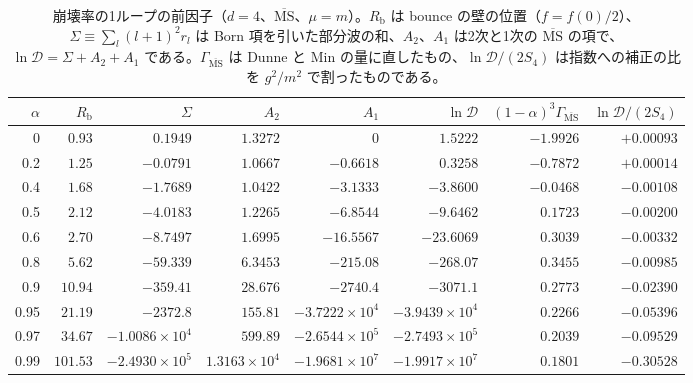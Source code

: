 \documentclass[a4paper,10pt]{ltjsarticle}
\begin{document}
\begin{table}[tbp]
\centering\small
\caption{崩壊率の1ループの前因子（$d=4$、$\overline{\mathrm{MS}}$、$\mu=m$）。$R_{\mathrm b}$ は bounce の壁の位置（$f=f(0)/2$）、$\Sigma\equiv\sum_l(l+1)^2r_l$ は Born 項を引いた部分波の和、$A_2$、$A_1$ は2次と1次の $\overline{\mathrm{MS}}$ の項で、$\ln\mathcal D=\Sigma+A_2+A_1$ である。$\Gamma_{\overline{\mathrm{MS}}}$ は Dunne と Min の量に直したもの、$\ln\mathcal D/(2S_4)$ は指数への補正の比を $g^2/m^2$ で割ったものである。}
\label{tab:prefactor}
\setlength{\tabcolsep}{4pt}
\begin{tabular}{rrrrrrrr}
\toprule
$\alpha$ & $R_{\mathrm b}$ & $\Sigma$ & $A_2$ & $A_1$ & $\ln\mathcal D$ & $(1-\alpha)^3\Gamma_{\overline{\mathrm{MS}}}$ & $\ln\mathcal D/(2S_4)$ \\
\midrule
0 & $0.93$ & $0.1949$ & $1.3272$ & $0$ & $1.5222$ & $-1.9926$ & $+0.00093$ \\
0.2 & $1.25$ & $-0.0791$ & $1.0667$ & $-0.6618$ & $0.3258$ & $-0.7872$ & $+0.00014$ \\
0.4 & $1.68$ & $-1.7689$ & $1.0422$ & $-3.1333$ & $-3.8600$ & $-0.0468$ & $-0.00108$ \\
0.5 & $2.12$ & $-4.0183$ & $1.2265$ & $-6.8544$ & $-9.6462$ & $0.1723$ & $-0.00200$ \\
0.6 & $2.70$ & $-8.7497$ & $1.6995$ & $-16.5567$ & $-23.6069$ & $0.3039$ & $-0.00332$ \\
0.8 & $5.62$ & $-59.339$ & $6.3453$ & $-215.08$ & $-268.07$ & $0.3455$ & $-0.00985$ \\
0.9 & $10.94$ & $-359.41$ & $28.676$ & $-2740.4$ & $-3071.1$ & $0.2773$ & $-0.02390$ \\
0.95 & $21.19$ & $-2372.8$ & $155.81$ & $-3.7222\times10^{4}$ & $-3.9439\times10^{4}$ & $0.2266$ & $-0.05396$ \\
0.97 & $34.67$ & $-1.0086\times10^{4}$ & $599.89$ & $-2.6544\times10^{5}$ & $-2.7493\times10^{5}$ & $0.2039$ & $-0.09529$ \\
0.99 & $101.53$ & $-2.4930\times10^{5}$ & $1.3163\times10^{4}$ & $-1.9681\times10^{7}$ & $-1.9917\times10^{7}$ & $0.1801$ & $-0.30528$ \\
\bottomrule
\end{tabular}
\end{table}
\end{document}

